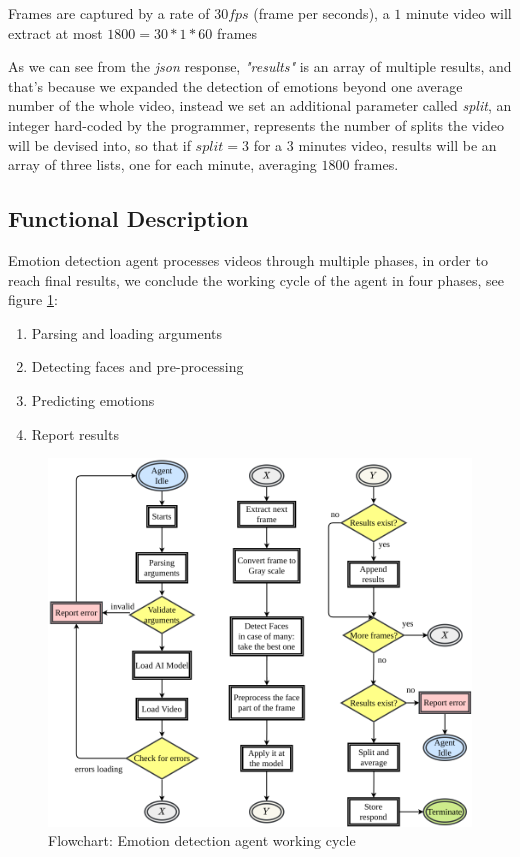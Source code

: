 Frames are captured by a rate of $30 fps$ (frame per seconds), a $1$ minute video will extract at most $1800 = 30*1*60$ frames

As we can see from the \textit{json} response, \textit{"results"} is an array of multiple results, and that's because we expanded the detection of emotions beyond one average number of the whole video, instead we set an additional parameter called \textit{split}, an integer hard-coded by the programmer, represents the number of splits the video will be devised into, so that if $split = 3$ for a 3 minutes video, results will be an array of three lists, one for each minute, averaging $1800$ frames.

\subsection{Functional Description}

Emotion detection agent processes videos through multiple phases, in order to reach final results, we conclude the working cycle of the agent in four phases, see figure \ref{fig:emotion_flow}:
\begin{enumerate}
    \item Parsing and loading arguments
    \item Detecting faces and pre-processing
    \item Predicting emotions
    \item Report results\\
\end{enumerate}

\begin{figure}[h]
\centering
\includegraphics[width=1\textwidth]{images/emotion_flow.png}
\caption{Flowchart: Emotion detection agent working cycle}
\label{fig:emotion_flow}
\end{figure}

